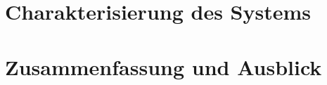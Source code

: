 \chapter{Charakterisierung des Systems}\label{kap:charakterisierung}

\chapter{Zusammenfassung und Ausblick}\label{kap:zusammenfassung_und_ausblick}
\begin{appendix}

\end{appendix}